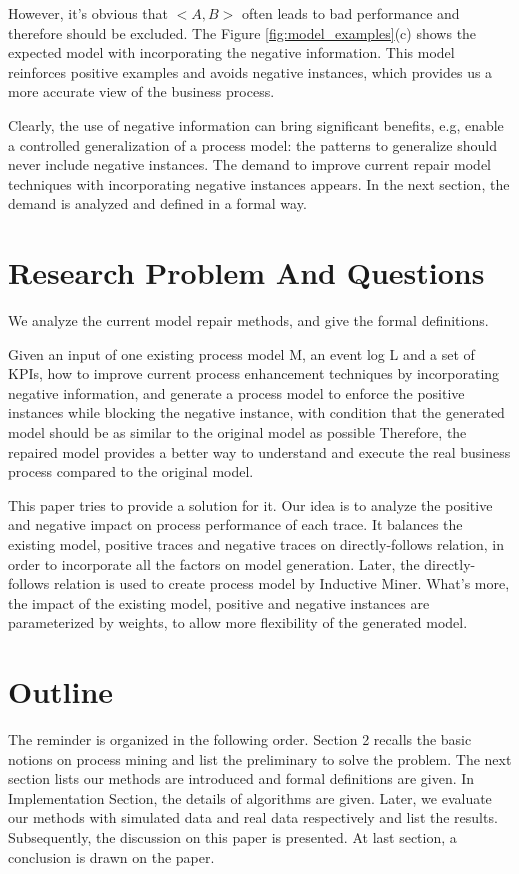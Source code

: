 However, it's obvious that $<A,B>$ often leads to bad performance and therefore should be excluded. The Figure \ref{fig:model_examples}(c) shows the expected model with incorporating the negative information. This model reinforces positive examples and avoids negative instances, which provides us a more accurate view of the business process.

Clearly, the use of negative information can bring significant benefits, e.g, enable a controlled generalization of a process model: the patterns to generalize should never include negative instances. The demand to improve current repair model techniques with incorporating negative instances appears. In the next section, the demand is analyzed and defined in a formal way.

\section{Research Problem And Questions}
We analyze the current model repair methods, and give the formal definitions.
\begin{definition}
Given an input of one existing process model M, an event log L and a set of KPIs, how  to improve current process enhancement techniques by incorporating negative information, and generate a process model to enforce the positive instances while blocking the negative instance, with condition that the generated model should be as similar to the original model as possible Therefore, the repaired model provides a better way to understand and execute the real business process compared to the original model.
\end{definition}


This paper tries to provide a solution for it. Our idea is to analyze the positive and negative impact on process performance of each trace. It balances the existing model, positive traces and negative traces on directly-follows relation, in order to incorporate all the factors on model generation. Later, the directly-follows relation is used to create process model by Inductive Miner. What's more, the impact of the existing model, positive and negative instances are parameterized by weights, to allow more flexibility of the generated model.

\section{Outline}
The reminder is organized in the following order. Section 2 recalls the basic notions on process mining and list the preliminary to solve the problem. The next section lists our methods are introduced and formal definitions are given. In Implementation Section, the details of algorithms are given. Later, we evaluate our methods with simulated data and real data respectively and list the results. Subsequently, the discussion on this paper is presented. At last section, a conclusion is drawn on the paper. 


%